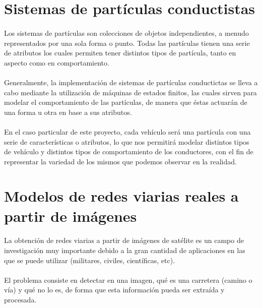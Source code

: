 \section{Sistemas de partículas conductistas}
	
	\paragraph{}
	Los sistemas de partículas son colecciones de objetos independientes, a menudo representados por una sola forma o punto. Todas las partículas tienen una serie de atributos los cuales permiten tener distintos tipos de partícula, tanto en aspecto como en comportamiento.
	
	\paragraph{}
	Generalmente, la implementación de sistemas de partículas conductictas se lleva a cabo mediante la utilización de máquinas de estados finitos, las cuales sirven para modelar el comportamiento de las partículas, de manera que éstas actuarán de una forma u otra en base a sus atributos.
	
	\paragraph{}
	En el caso particular de este proyecto, cada vehículo será una partícula con una serie de características o atributos, lo que nos permitirá modelar distintos tipos de vehículo y distintos tipos de comportamiento de los conductores, con el fin de representar la variedad de los mismos que podemos observar en la realidad.

\section{Modelos de redes viarias reales a partir de imágenes}

	\paragraph{}
	La obtención de redes viarias a partir de imágenes de satélite es un campo de investigación muy importante debido a la gran cantidad de aplicaciones en las que se puede utilizar (militares, civiles, científicas, etc).
	
	\paragraph{}
	El problema consiste en detectar en una imagen, qué es una carretera (camino o vía) y qué no lo es, de forma que esta información pueda ser extraída y procesada.
	
